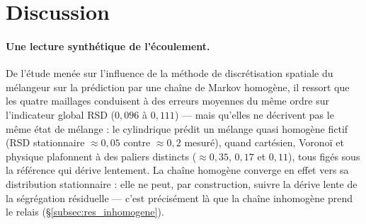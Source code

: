 \documentclass[french]{MemoireMaster}
\begin{document}
\begin{table}[H]
  \centering
  \caption{Écart moyen de RSD avec la référence DEM, pour les chaînes homogène et inhomogène et pour chaque méthode de discrétisation, sur la fenêtre de prédiction $t \in [1{,}57~\text{s};\,60~\text{s}]$ (chaîne inhomogène : cinq matrices apprises à 1{,}57~s, 12{,}56~s, 23{,}55~s, 34{,}54~s et 45{,}53~s). Le gain de l'inhomogénéité est considérable pour les maillages statistiques, marginal pour les maillages géométriques.}
  \label{tab:inhomogene}
\end{table}



\section{Discussion}
\label{sec:discussion}

\paragraph{Une lecture synthétique de l'écoulement.}
De l'étude menée sur l'influence de la méthode de discrétisation spatiale du mélangeur sur la prédiction par une chaîne de Markov homogène, il ressort que les quatre maillages conduisent à des erreurs moyennes du même ordre sur l'indicateur global RSD ($0{,}096$ à $0{,}111$) --- mais qu'elles ne décrivent pas le même état de mélange : le cylindrique prédit un mélange quasi homogène fictif (RSD stationnaire $\approx 0{,}05$ contre $\approx 0{,}2$ mesuré), quand cartésien, Voronoï et physique plafonnent à des paliers distincts ($\approx 0{,}35$, $0{,}17$ et $0{,}11$), tous figés sous la référence qui dérive lentement. La chaîne homogène converge en effet vers sa distribution stationnaire : elle ne peut, par construction, suivre la dérive lente de la ségrégation résiduelle --- c'est précisément là que la chaîne inhomogène prend le relais (\S\ref{subsec:res_inhomogene}). 
\end{document}
